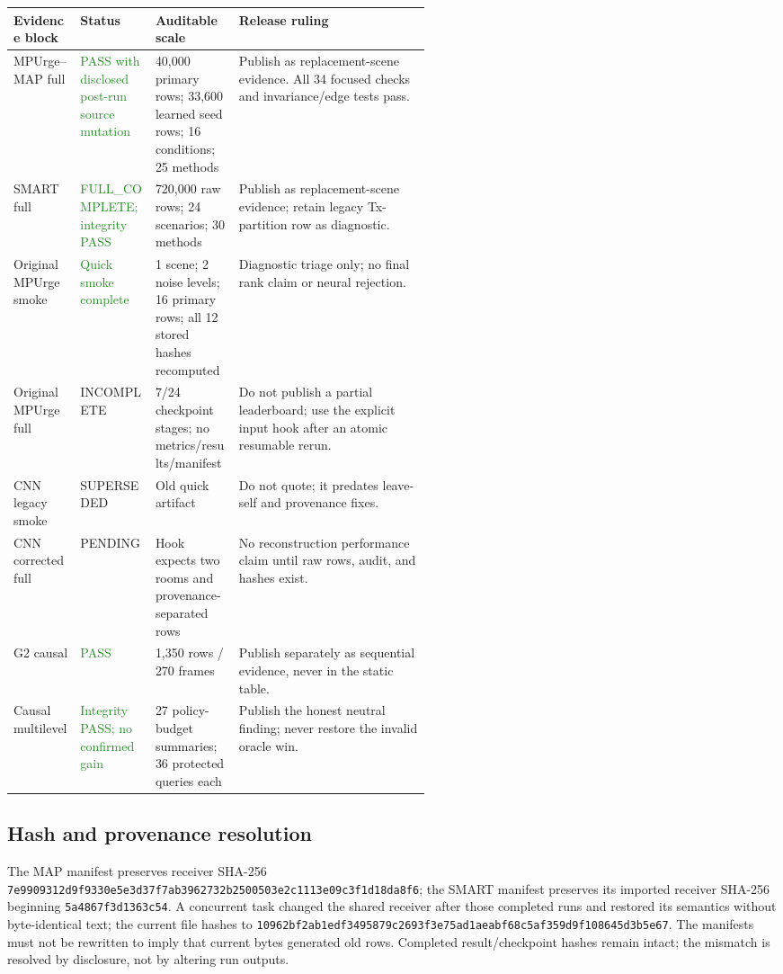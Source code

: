 \documentclass[10pt]{article}
\newcommand{\good}[1]{\textcolor{ForestGreen}{#1}}
\newcommand{\caution}[1]{\textcolor{BrickRed}{#1}}
\begin{document}
\small
\begin{tabularx}{\linewidth}{@{}p{0.16\linewidth}p{0.18\linewidth}p{0.20\linewidth}Y@{}}
\toprule Evidence block & Status & Auditable scale & Release ruling\\\midrule
MPUrge--MAP full & \good{PASS with disclosed post-run source mutation} & 40,000 primary rows; 33,600 learned seed rows; 16 conditions; 25 methods & Publish as replacement-scene evidence. All 34 focused checks and invariance/edge tests pass.\\
SMART full & \good{FULL\_COMPLETE; integrity PASS} & 720,000 raw rows; 24 scenarios; 30 methods & Publish as replacement-scene evidence; retain legacy Tx-partition row as diagnostic.\\
Original MPUrge smoke & \good{Quick smoke complete} & 1 scene; 2 noise levels; 16 primary rows; all 12 stored hashes recomputed & Diagnostic triage only; no final rank claim or neural rejection.\\
Original MPUrge full & \caution{INCOMPLETE} & 7/24 checkpoint stages; no metrics/results/manifest & Do not publish a partial leaderboard; use the explicit input hook after an atomic resumable rerun.\\
CNN legacy smoke & \caution{SUPERSEDED} & Old quick artifact & Do not quote; it predates leave-self and provenance fixes.\\
CNN corrected full & \caution{PENDING} & Hook expects two rooms and provenance-separated rows & No reconstruction performance claim until raw rows, audit, and hashes exist.\\
G2 causal & \good{PASS} & 1,350 rows / 270 frames & Publish separately as sequential evidence, never in the static table.\\
Causal multilevel & \good{Integrity PASS; no confirmed gain} & 27 policy-budget summaries; 36 protected queries each & Publish the honest neutral finding; never restore the invalid oracle win.\\
\bottomrule
\end{tabularx}
\normalsize

\subsection{Hash and provenance resolution}

The MAP manifest preserves receiver SHA-256\\
\texttt{7e990931\allowbreak{}2d9f9330\allowbreak{}e5e3d37f\allowbreak{}7ab39627\allowbreak{}32b25005\allowbreak{}03e2c111\allowbreak{}3e09c3f1\allowbreak{}d18da8f6};
the SMART manifest preserves its imported receiver SHA-256 beginning
\texttt{5a4867f3d1363c54}.  A concurrent task changed the shared receiver after
those completed runs and restored its semantics without byte-identical text;
the current file hashes to
\texttt{10962bf2ab1edf34\allowbreak{}95879c2693f3e75a\allowbreak{}d1aeabf68c5af359\allowbreak{}d9f108645d3b5e67}.
The manifests must not be rewritten to imply that current bytes generated old
rows.  Completed result/checkpoint hashes remain intact; the mismatch is
resolved by disclosure, not by altering run outputs.
\end{document}
